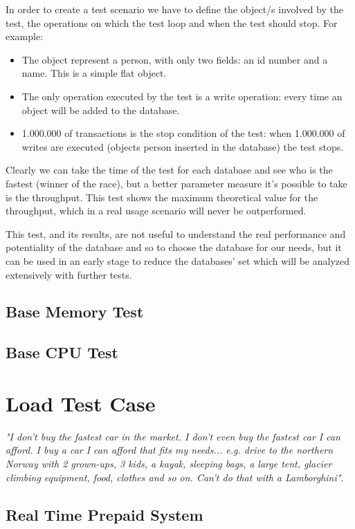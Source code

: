 In order to create a test scenario we have to define the object/s involved by the test, the operations on which the test loop and when the test should stop. For example:
\begin{itemize}
	\item The object represent a person, with only two fields: an id number and a name. This is a simple flat object. 
	\item The only operation executed by the test is a write operation: every time an object will be added to the database.
	\item 1.000.000 of transactions is the stop condition of the test: when 1.000.000 of writes are executed (objects person inserted in the database) the test stops.
\end{itemize}
Clearly we can take the time of the test for each database and see who is the fastest (winner of the race), but a better parameter measure it's possible to take is the throughput. This test shows the maximum theoretical value for the throughput, which in a real usage scenario will never be outperformed. 

This test, and its results, are not useful to understand the real performance and potentiality of the database and so to choose the database for our needs, but it can be used in an early stage to reduce the databases' set which will be analyzed extensively with further tests.


		\subsection{Base Memory Test}
		\subsection{Base CPU Test}
		
		
	\section{Load Test Case}
\emph{"I don't buy the fastest car in the market. I don't even buy the fastest car I can afford. I buy a car I can afford that fits my needs... e.g. drive to the northern Norway with 2 grown-ups, 3 kids, a kayak, sleeping bags, a large tent, glacier climbing equipment, food, clothes and so on. Can't do that with a Lamborghini"}\cite{Bernt}.

		\subsection{Real Time Prepaid System}
